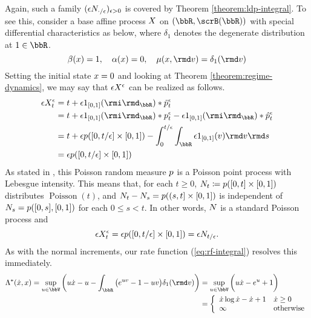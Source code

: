 \begin{example}[Poisson]
  Again, such a family $(\epsilon N_{\cdot/\epsilon})_{\epsilon>0}$ is covered by Theorem \ref{theorem:ldp-integral}.
  To see this, consider a base affine process $X$ on $(\bbR, \scrB(\bbR))$ with special differential characteristics as below, where $\delta_1$ denotes the degenerate distribution at $1 \in \bbR$.
  \begin{equation*}
    \affDrift(\stateVar) = 1, \quad \affDiff(\stateVar) = 0, \quad \affJump(\stateVar, \rmd\markVar) = \delta_1(\rmd\markVar)
  \end{equation*}
  Setting the initial state $x = 0$ and looking at Theorem \ref{theorem:regime-dynamics}, we may say that $\epsilon X^\epsilon$ can be realized as follows.
  \begin{align*}
    \Xe_t 
    &= t + \epsilon 1_{[0,1]}(\id_\bbR) \ast \compensate{\poisRM^\epsilon}_t \\
    &= t + \epsilon 1_{[0,1]}(\id_\bbR) \ast \poisRM^\epsilon_t - \epsilon 1_{[0,1]}(\id_\bbR) \ast \predproj{\poisRM^\epsilon}_t \\
    &= t + \epsilon \poisRM([0,t/\epsilon] \times [0,1]) - \int_0^{t/\epsilon} \int_\bbR \epsilon 1_{[0,1]}(\markVar) \rmd\markVar \rmd s \\
    &= \epsilon \poisRM([0,t/\epsilon] \times [0,1])
  \end{align*}
  As stated in \cite[Theorem II.4.8]{jacod2003}, this Poisson random measure $p$ is a Poisson point process with Lebesgue intensity.
  This means that, for each $t \geq 0$, $N_t \coloneqq p([0,t] \times [0,1])$ distributes $\operatorname{Poisson}(t)$, and $N_t - N_s = p((s,t] \times [0,1])$ is independent of $N_s = p([0,s], [0,1])$ for each $0 \leq s < t$.
  In other words, $N$ is a standard Poisson process and
  \begin{equation*}
    \epsilon X^\epsilon_t = \epsilon p([0,t/\epsilon] \times [0,1]) = \epsilon N_{t/\epsilon}.
  \end{equation*}
  As with the normal increments, our rate function (\ref{eq:rf-integral}) resolves this immediately.
  \begin{align*}
    \ode^*(\dot\stateVar, \stateVar) 
    = \sup_{\momentVar\in\vecSpace} \bigg( \momentVar\dot\stateVar - \momentVar - \int_\bbR \big( e^{\momentVar\markVar} - 1 - \momentVar\markVar \big) \delta_1(\rmd\markVar) \bigg) 
    &= \sup_{\momentVar\in\vecSpace} \bigg( \momentVar\dot\stateVar - e^\momentVar + 1 \bigg) \\
    &= \left\{\begin{array}{ll}
      \dot\stateVar \log\dot\stateVar - \dot\stateVar + 1 & \dot\stateVar \geq 0 \\
      \infty & \text{otherwise}
    \end{array}\right.
  \end{align*}
\end{example}
